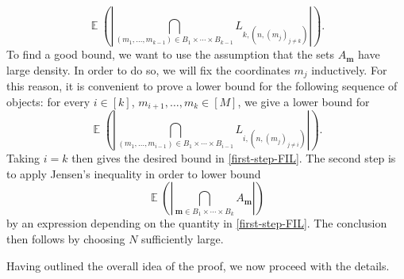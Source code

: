 \documentclass[letter, 11pt]{article}
\theoremstyle{plain} %
\theoremstyle{definition} %
\theoremstyle{plain}
\theoremstyle{plain}
\newcommand{\1}{\mathbbm{1}}
\newcommand{\E}{\operatorname{\mathbb{E}}}
\begin{document}
\begin{equation}\label{first-step-FIL}
   \E\left(\left|\bigcap_{(m_1,\ldots,m_{k-1})\in B_1\times \cdots \times B_{k-1}} L_{k,(n,(m_j)_{j\neq k})} \right|\right). 
\end{equation}
 To find a good bound, we want to use the assumption that the sets $A_{\boldsymbol{m}}$ have large density. In order to do so, we will fix the coordinates $m_j$ inductively. For this reason, it is convenient to prove a lower bound for the following sequence of objects: for every $i\in [k]$, $m_{i+1},\ldots,m_k\in [M]$, we give a lower bound for
    \begin{equation*}
         \E\left( \left| \bigcap_{( m_1,\ldots,m_{i-1})\in  B_1\times \cdots \times B_{i-1} } L_{i,(n,(m_j)_{j\neq i })} \right| \right).
    \end{equation*}
Taking $i=k$ then gives the desired bound in \cref{first-step-FIL}.
The second step is to apply Jensen's inequality in order to lower bound
$$\E\left( \left| \bigcap_{\boldsymbol{m}\in B_1\times \cdots \times B_{k}} A_{\boldsymbol{m}} \right| \right)$$
by an expression depending on the quantity in \cref{first-step-FIL}. The conclusion then follows by choosing $N$ sufficiently large.  

Having outlined the overall idea of the proof, we now proceed with the details.
\end{document}
